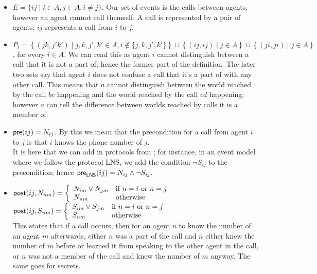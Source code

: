 \documentclass[10pt, a4paper]{report}
\begin{document}
\begin{itemize}
\item $E = \{ij \mid i \in A, j \in A, i \not = j\}$. Our set of events is the
  calls between agents, however an agent cannot call themself. A call is
  represented by a pair of agents; $ij$ represents a call from $i$ to $j$.
\item $P_i = \left\{(jk, j'k') \mid j, k, j', k' \in A, i \not \in \{j, k, j',
    k'\}\right\} \cup \left\{ (ij, ij) \mid j \in A\right\} \cup \left\{ (ji,
    ji) \mid j \in A \right\}$, for every $i \in A$. We can read this as agent
  $i$ cannot distinguish between a call that it is not a part of; hence the
  former part of the definition. The later two sets say that agent $i$ does not
  confuse a call that it's a part of with any other call. This means that $a$
  cannot distinguish between the world reached by the call $bc$
  happening and the world reached by the call $cd$ happening; however $a$ can
  tell the difference between worlds reached by calls it is a member of. 
\item $\textsf{pre}(ij) = N_{ij}$. By this we mean that the precondition for a call from
  agent $i$ to $j$ is that $i$ knows the phone number of $j$. \\
  It is here that we
  can add in protocols from ; for instance, in an event
  model where we follow the protocol \textsf{LNS}, we add the condition $\neg
  S_{ij}$ to the precondition; hence $\textsf{pre}_{\textsf{LNS}}(ij) = N_{ij} \land
  \neg S_{ij}$.
\item $\textsf{post}(ij, N_{nm}) = \left\{ \begin{array}{ll}
                                     N_{im} \lor N_{jm} & \text{if $n = i$ or $n =
                                                     j$} \\
                                     N_{nm} & \text{otherwise} 
                                   \end{array}
                           \right.$ \\
$\textsf{post}(ij, S_{nm}) = \left\{ \begin{array}{ll}
                                     S_{im} \lor S_{jm} & \text{if $n = i$ or $n =
                                                     j$} \\
                                     S_{nm} & \text{otherwise} 
                                   \end{array}
                           \right.$ \\
 This states that if a call occurs, then for an agent $n$ to know the number of
 an agent $m$ afterwards, either $n$ was a part of the call and $n$ either knew the number
 of $m$ before or learned it from speaking to the other agent in the call, or
 $n$ was not a member of the call and knew the number of $m$ anyway. The same
 goes for secrets. 
\end{itemize}
\end{document}
